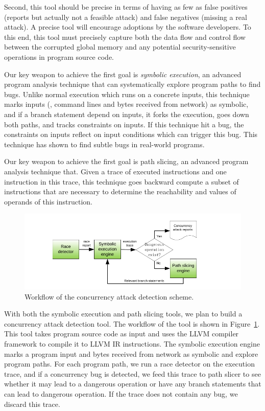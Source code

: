 Second, this tool should be precise in terms of having as few as false 
positives (reports but actually not a feasible attack) and false negatives 
(missing a real attack). A precise tool will encourage adoptions by the 
software developers. To this end, this tool must precisely capture both the 
data flow and control flow between the corrupted global memory and any 
potential security-sensitive operations in program source code. 

Our key weapon to achieve the first goal is \emph{symbolic execution}, an 
advanced program analysis technique that can systematically explore program 
paths to find bugs. Unlike normal execution which runs on a concrete 
inputs, this technique marks inputs (\eg, command lines and bytes received from 
network) as symbolic, and if a branch statement depend on inputs, it forks the 
execution, goes down both paths, and tracks constraints on inputs. If this 
technique hit a bug, the constraints on inputs reflect on input conditions 
which can trigger this bug. This technique has shown to find subtle bugs in 
real-world programs.

Our key weapon to achieve the first goal is path slicing, an advanced program 
analysis technique that. Given a trace of executed instructions and one 
instruction in this trace, this technique goes backward compute a subset of 
instructions that are necessary to determine the reachability and values of 
operands of this instruction.

\begin{figure}[ht]
\centering
\includegraphics[width=0.5\columnwidth]{figures/detection}
\vspace{-.05in}
\caption{{Workflow of the concurrency attack detection scheme.}} 
\label{fig:detection}
\vspace{-.05in}
\end{figure}

With both the symbolic execution and path slicing tools, we plan to build a 
concurrency attack detection tool. The workflow of the tool is shown in 
Figure~\ref{fig:detection}. This tool takes program source code as input and 
uses the LLVM compiler framework to compile it to LLVM IR instructions. The 
symbolic execution engine marks a program input and bytes received from network 
as symbolic and explore program paths. For each program path, we run a race 
detector on the execution trace, and if a concurrency bug is detected, we feed 
this trace to path slicer to see whether it may lead to a dangerous operation 
or have any branch statements that can lead to dangerous operation. If the 
trace does not contain any bug, we discard this trace.

